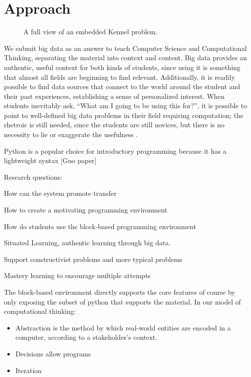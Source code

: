 \documentclass{sig-alternate}
\begin{document}
\section{Approach}

\begin{figure*}
\label{fig-full-kennel}
\caption{A full view of an embedded Kennel problem.}
\end{figure*}

We submit big data as an answer to teach Computer Science and Computational Thinking, separating the material into context and content.
Big data provides an authentic, useful context for both kinds of students, since using it is something that almost all fields are beginning to find relevant.
Additionally, it is readily possible to find data sources that connect to the world around the student and their past experiences, establishing a sense of personalized interest.
When students inevitably ask, ``What am I going to be using this for?'', it is possible to point to well-defined  big data problems in their field requiring computation; the rhetroic is still needed, since the students are still novices, but there is no necessity to lie or exaggerate the usefulness \cite{guzdial2006imagineering}.


Python is a popular choice for introductory programming because it  has a lightweight syntax [Guo paper]


Research questions:

How can the system promote transfer

How to create a motivating programming environment

How do students use the block-based programming environment

Situated Learning, authentic learning through big data.

Support constructivist problems and more typical problems

Mastery learning to encourage multiple attempts

The block-based environment directly supports the core features of course by only exposing the subset of python that supports the material. In our model of computational thinking:
\begin{itemize}
	\item Abstraction is the method by which real-world entities are encoded in a computer, according to a stakeholder's context.
	\item Decisions allow programs
	\item Iteration
\end{itemize}
\end{document}
